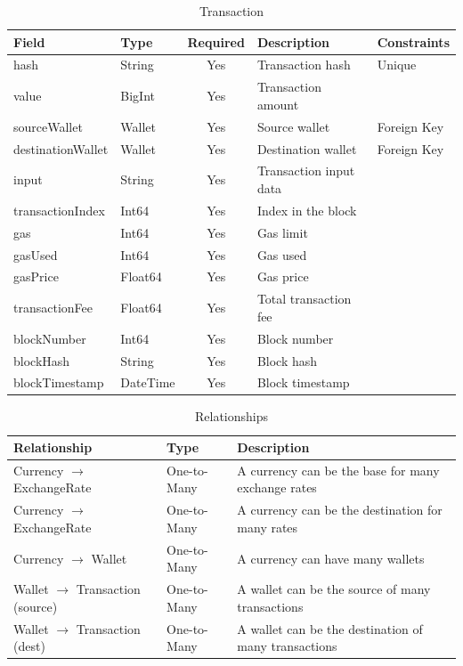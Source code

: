 \begin{table}[htbp]
  \centering
  \caption{Transaction}
  \footnotesize
  \renewcommand{\arraystretch}{1.1}
  \setlength{\tabcolsep}{6pt}
  \begin{tabular}{|l|l|c|p{4cm}|p{2.8cm}|}
    \hline
    \textbf{Field} & \textbf{Type} & \textbf{Required} & \textbf{Description} & \textbf{Constraints} \\
    \hline
    hash & String & Yes & Transaction hash & Unique \\
    \hline
    value & BigInt & Yes & Transaction amount & \\
    \hline
    sourceWallet & Wallet & Yes & Source wallet & Foreign Key \\
    \hline
    destinationWallet & Wallet & Yes & Destination wallet & Foreign Key \\
    \hline
    input & String & Yes & Transaction input data & \\
    \hline
    transactionIndex & Int64 & Yes & Index in the block & \\
    \hline
    gas & Int64 & Yes & Gas limit & \\
    \hline
    gasUsed & Int64 & Yes & Gas used & \\
    \hline
    gasPrice & Float64 & Yes & Gas price & \\
    \hline
    transactionFee & Float64 & Yes & Total transaction fee & \\
    \hline
    blockNumber & Int64 & Yes & Block number & \\
    \hline
    blockHash & String & Yes & Block hash & \\
    \hline
    blockTimestamp & DateTime & Yes & Block timestamp & \\
    \hline
  \end{tabular}
\end{table}

\begin{table}[htbp]
  \centering
  \caption{Relationships}
  \footnotesize
  \renewcommand{\arraystretch}{1.4}
  \setlength{\tabcolsep}{6pt}
  \begin{tabular}{|l|l|p{7cm}|}
    \hline
    \textbf{Relationship} & \textbf{Type} & \textbf{Description} \\
    \hline
    Currency $\rightarrow$ ExchangeRate & One-to-Many & A currency can be the base for many exchange rates \\
    \hline
    Currency $\rightarrow$ ExchangeRate & One-to-Many & A currency can be the destination for many rates \\
    \hline
    Currency $\rightarrow$ Wallet & One-to-Many & A currency can have many wallets \\
    \hline
    Wallet $\rightarrow$ Transaction (source) & One-to-Many & A wallet can be the source of many transactions \\
    \hline
    Wallet $\rightarrow$ Transaction (dest) & One-to-Many & A wallet can be the destination of many transactions \\
    \hline
  \end{tabular}
\end{table}

